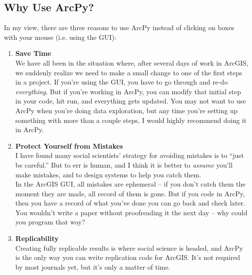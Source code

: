 \documentclass[12pt]{article}
\begin{document}
\subsection*{Why Use ArcPy?}
In my view, there are three reasons to use ArcPy instead of clicking on boxes with your mouse (i.e. using the GUI):
\begin{enumerate}
	\item \textbf{Save Time} \\
	We have all been in the situation where, after several days of work in ArcGIS, we suddenly realize we need to make a small change to one of the first steps in a project. If you're using the GUI, you have to go through and re-do \emph{everything}. But if you're working in ArcPy, you can modify that initial step in your code, hit run, and everything gets updated. You may not want to use ArcPy when you're doing data exploration, but any time you're setting up something with more than a couple steps, I would highly recommend doing it in ArcPy. 
	\item \textbf{Protect Yourself from Mistakes} \\
	I have found many social scientists' strategy for avoiding mistakes is to ``just be careful.'' But to err is human, and I think it is better to \emph{assume} you'll make mistakes, and to design systems to help you catch them. \\
	In the ArcGIS GUI, all mistakes are ephemeral -- if you don't catch them the moment they are made, all record of them is gone. But if you code in ArcPy, then you have a record of what you've done you can go back and check later. You wouldn't write a paper without proofreading it the next day -- why could you program that way?
	\item \textbf{Replicability} \\
	Creating fully replicable results is where social science is headed, and ArcPy is the only way you can write replication code for ArcGIS. It's not required by most journals yet, but it's only a matter of time. 
\end{enumerate}
\end{document}
